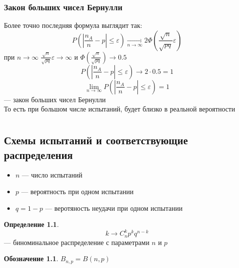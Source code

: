 \documentclass[oneside]{book}
\theoremstyle{plain}
\theoremstyle{remark}
\theoremstyle{definition}
\newtheorem*{definition}{Определение}
\newtheorem*{symb}{Обозначение}
\begin{document}
\subsection{Закон больших чисел Бернулли}
\label{sec:orgb46eecb}
Более точно последняя формула выглядит так:
\[ P\left(\left|\frac{n_A}{n} - p\right| \le \varepsilon\right) \xrightarrow[n \to \infty]{} 2\Phi\left(\frac{\sqrt{n}}{\sqrt{pq}}\varepsilon\right) \]
при \(n \to \infty\) \(\frac{\sqrt{n}}{\sqrt{pq}}\varepsilon \to \infty\) и \(\Phi\left(\frac{\sqrt{n}}{\sqrt{pq}}\right) \to 0.5\)
\[ P\left(\left|\frac{n_A}{n} - p\right| \le \varepsilon\right) \to 2\cdot0.5 = 1\]
\[ \lim_{n\to\infty}P\left(\left|\frac{n_A}{n} - p \right| \le \varepsilon \right) = 1 \]
--- закон больших чисел Бернулли \\
То есть при большом числе испытаний, будет близко в реальной вероятности
\chapter{}
\label{sec:org242bb45}
\section{Схемы испытаний и соответствующие распределения}
\label{sec:orgb0c8131}
\begin{itemize}
\item \(n\) --- число испытаний
\item \(p\) --- вероятность при одном испытании
\item \(q = 1 - p\) --- веротяность неудачи при одном испытании
\end{itemize}


\begin{definition}
\[ k \to C^k_n p^k q^{n - k} \] --- биноминальное распределение с параметрами \(n\) и \(p\)
\end{definition}
\begin{symb}
\(B_{n,p} = B(n, p)\)
\end{symb}
\end{document}
